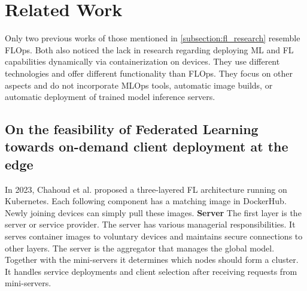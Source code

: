 \section{Related Work}

Only two previous works \cite{paper:fl_toward_on_demand_client_deployment_at_edge, paper:global_fl_platform_for_iot} of those mentioned in \ref{subsection:fl_research} resemble FLOps.
Both also noticed the lack in research regarding deploying ML and FL capabilities dynamically via containerization on devices.
They use different technologies and offer different functionality than FLOps.
They focus on other aspects and do not incorporate MLOps tools, automatic image builds, or automatic deployment of trained model inference servers.

\subsection{On the feasibility of Federated Learning towards on-demand client deployment at the edge}
In 2023, Chahoud et al. \cite{paper:fl_toward_on_demand_client_deployment_at_edge} proposed a three-layered FL architecture running on Kubernetes.
Each following component has a matching image in DockerHub.
Newly joining devices can simply pull these images.
\vspace{5mm}
\newline
\textbf{Server}\newline
The first layer is the server or service provider.
The server has various managerial responsibilities.
It serves container images to voluntary devices and maintains secure connections to other layers.
The server is the aggregator that manages the global model.
Together with the mini-servers it determines which nodes should form a cluster.
It handles service deployments and client selection after receiving requests from mini-servers.

